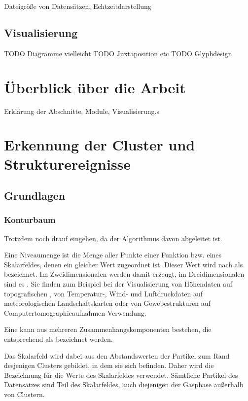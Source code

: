 Dateigröße von Datensätzen, Echtzeitdarstellung

\section{Visualisierung}

TODO Diagramme vielleicht
TODO Juxtaposition etc
TODO Glyphdesign

\chapter{Überblick über die Arbeit}

Erklärung der Abschnitte, Module, Visualisierung.s

\chapter{Erkennung der Cluster und Strukturereignisse}

\section{Grundlagen}
\subsection{Konturbaum}\label{sec:grundlagen:konturbaum}
Trotzdem noch drauf eingehen, da der Algorithmus davon abgeleitet ist.

Eine Niveaumenge ist die Menge aller Punkte einer Funktion bzw. eines Skalarfeldes, denen ein gleicher Wert zugeordnet ist. Dieser Wert wird nach \cite[S.~1]{carr2010flexibleIsosurfaces} als  bezeichnet. Im Zweidimensionalen werden damit  erzeugt, im Dreidimensionalen sind es . Sie finden zum Beispiel bei der Visualisierung von Höhendaten auf topografischen \cite{hurni2010landform} \cite{openstreetmapContours}, von Temperatur-, Wind- und Luftdruckdaten auf meteorologischen Landschaftskarten \cite{hopkins1996weather} oder von Gewebestrukturen auf Computertomographieaufnahmen \cite{tang2014ctImages} Verwendung.

Eine  kann aus mehreren Zusammenhangskomponenten bestehen, die entsprechend \cite[S.~2]{carr2001computingCountourTrees} als  bezeichnet werden.

Das Skalarfeld wird dabei aus den Abstandswerten der Partikel zum Rand desjenigen Clusters gebildet, in dem sie sich befinden. Daher wird die Bezeichnung  für die Werte des Skalarfeldes verwendet. Sämtliche Partikel des Datensatzes sind Teil des Skalarfeldes, auch diejenigen der Gasphase außerhalb von Clustern.

